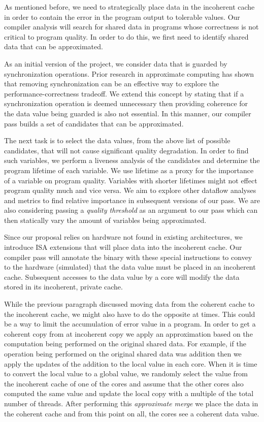 \documentclass[12pt,conference]{IEEEtran}
\begin{document}
As mentioned before, we need to strategically place data
in the incoherent cache in order to contain the error in the 
program output to tolerable values. Our compiler analysis will search
for shared data in programs whose correctness is not critical to 
program quality. In order to do this, we first need to identify 
shared data that can be approximated. 

As an initial version of the project, we consider data 
that is guarded by synchronization operations. Prior research 
in approximate computing has shown that removing synchronization 
can be an effective way to explore the performance-correctness 
tradeoff. We extend this concept by stating that if a
synchronization operation is deemed unnecessary then 
providing coherence for the data value being guarded is also 
not essential. In this manner, our compiler pass builds a 
set of candidates that can be approximated. 

The next task is to select the data values, from the 
above list of possible candidates, that will not cause 
significant quality degradation. In order to find such
variables, we perform a liveness analysis of the candidates 
and determine the program lifetime of each variable. We use
lifetime as a proxy for the importance of a variable on program
quality. Variables with shorter lifetimes might not effect program 
quality much and vice versa. We aim to explore other dataflow 
analyses and metrics to find relative importance in subsequent
versions of our pass. We are also considering passing a 
\emph{quality threshold} as an argument to our pass which can then statically vary the
amount of variables being approximated. 

Since our proposal relies on hardware not found in existing 
architectures, we introduce ISA extensions that will place data into 
the incoherent cache. Our compiler pass will annotate the binary
with these special instructions to convey to the hardware (simulated) 
that the data value must be placed in an incoherent cache. Subsequent
accesses to the data value by a core will modify the data stored in its
incoherent, private cache. 

While the previous paragraph discussed moving data from the coherent cache to 
the incoherent cache, we might also have to do the opposite at times. 
This could be a way to limit the accumulation of error value in a program. 
In order to get a coherent copy from at incoherent copy we
apply an approximation based on the computation being performed
on the original shared data. For example, if the operation being 
performed on the original shared data was addition then we 
apply the updates of the addition to the local value in each core. 
When it is time to convert the local value to a global value, 
we randomly select the value from the incoherent cache of one
of the cores and assume that the other cores also computed 
the same value and update the local copy with a multiple of the total number of threads. After performing this \emph{approximate merge}
we place the data in the coherent cache and from this 
point on all, the cores see a coherent data value.
\end{document}

